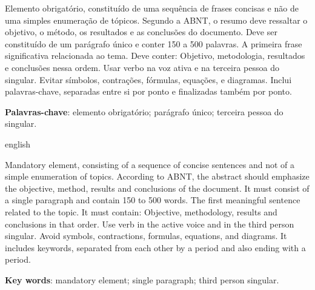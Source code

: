 
\setlength{\absparsep}{18pt} %
\begin{resumo}
 Elemento obrigatório, constituído de uma sequência de frases concisas e não
de uma simples enumeração de tópicos. Segundo a ABNT, o resumo deve ressaltar o objetivo, o método, os resultados e as conclusões do documento. Deve ser constituído de um parágrafo único e conter 150 a 500 palavras. A primeira frase significativa relacionada ao tema. Deve conter: Objetivo, metodologia, resultados e conclusões nessa ordem. Usar verbo na voz ativa e na terceira pessoa do singular. Evitar símbolos, contrações, fórmulas, equações, e diagramas. Inclui palavras-chave, separadas entre si por ponto e finalizadas também por ponto.
 
 \noindent
 \textbf{Palavras-chave}: elemento obrigatório; parágrafo único; terceira pessoa do singular.
 \newpage
\end{resumo}



\setlength{\absparsep}{18pt} %
\begin{resumo}
\begin{otherlanguage*}{english}


 Mandatory element, consisting of a sequence of concise sentences and not
of a simple enumeration of topics. According to ABNT, the abstract should emphasize the objective, method, results and conclusions of the document. It must consist of a single paragraph and contain 150 to 500 words. The first meaningful sentence related to the topic. It must contain: Objective, methodology, results and conclusions in that order. Use verb in the active voice and in the third person singular. Avoid symbols, contractions, formulas, equations, and diagrams. It includes keywords, separated from each other by a period and also ending with a period.


\end{otherlanguage*}
 
 \noindent
 \textbf{Key words}: mandatory element; single paragraph; third person singular.
 \newpage
\end{resumo}

\newpage

\listoffigures*
\cleardoublepage


